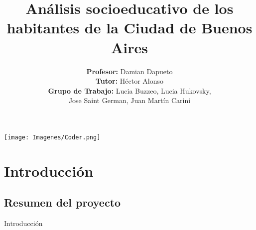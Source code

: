 \documentclass[pdf]{beamer}
\title[Data Science]{\textbf{Análisis socioeducativo de los habitantes de la Ciudad de Buenos Aires}}
\author[Coderhouse]{\textbf{Profesor:} Damian Dapueto \\ \vspace{0.1cm} \textbf{Tutor:} Héctor Alonso \\ \vspace{0.1cm} \textbf{Grupo de Trabajo:} Lucia Buzzeo, Lucia Hukovsky,\\ Jose Saint German, Juan Martín Carini}
\date{}
\begin{document}
\begin{frame}

    \begin{center}
        \texttt{[image: Imagenes/Coder.png]}
    \end{center}

    \titlepage

\end{frame}

\section{Introducción}

    \subsection{Resumen del proyecto}

    \begin{frame}{Introducción}

    \end{frame}




\end{document}
